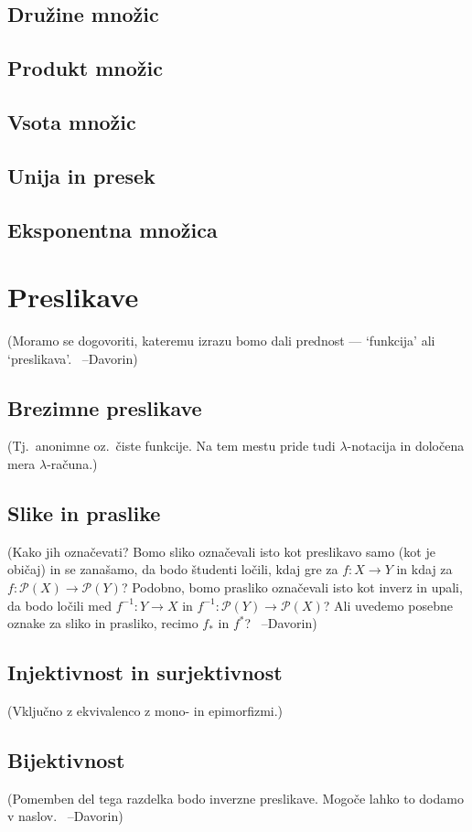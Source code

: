 \documentclass[11pt,a4paper,twoside]{book}
\newcommand{\davorin}[1]{{\small\textcolor{davorincolor}{(#1 \ \mbox{--Davorin})}}}
\newcommand{\note}[1]{{\small\textcolor{notecolor}{(#1)}}}
\newcommand{\pst}{\mathcal{P}}
\begin{document}
		\section{Družine množic}
		\section{Produkt množic}
		\section{Vsota množic}
		\section{Unija in presek}
		\section{Eksponentna množica}
	
	\chapter{Preslikave}
		\davorin{Moramo se dogovoriti, kateremu izrazu bomo dali prednost --- `funkcija' ali `preslikava'.}
		\section{Brezimne preslikave}\label{RAZDELEK: Brezimne preslikave}
			\note{Tj.~anonimne oz.~čiste funkcije. Na tem mestu pride tudi $\lambda$-notacija in določena mera $\lambda$-računa.}
		\section{Slike in praslike}
			\davorin{Kako jih označevati? Bomo sliko označevali isto kot preslikavo samo (kot je običaj) in se zanašamo, da bodo študenti ločili, kdaj gre za $f\colon X \to Y$ in kdaj za $f\colon \pst(X) \to \pst(Y)$? Podobno, bomo prasliko označevali isto kot inverz in upali, da bodo ločili med $f^{-1}\colon Y \to X$ in $f^{-1}\colon \pst(Y) \to \pst(X)$? Ali uvedemo posebne oznake za sliko in prasliko, recimo $f_*$ in $f^*$?}
		\section{Injektivnost in surjektivnost}\label{RAZDELEK: Injektivnost in surjektivnost}
			\note{Vključno z ekvivalenco z mono- in epimorfizmi.}
		\section{Bijektivnost}
			\davorin{Pomemben del tega razdelka bodo inverzne preslikave. Mogoče lahko to dodamo v naslov.}
			
\end{document}

